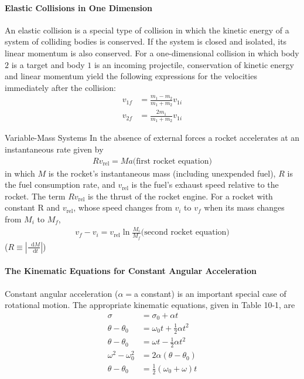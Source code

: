 \documentclass{article}
\newcommand*\diff{\mathop{}\!\mathrm{d}}
\numberwithin{equation}{subsection} %
\theoremstyle{definition}
\begin{document}
\paragraph{Elastic Collisions in One Dimension} An elastic collision
is a special type of collision in which the kinetic energy of a system
of colliding bodies is conserved. If the system is closed and
isolated, its linear momentum is also conserved. For a one-dimensional
collision in which body $2$ is a target and body $1$ is an incoming
projectile, conservation of kinetic energy and linear momentum yield
the following expressions for the velocities immediately after the
collision:
\begin{align}
    v_{1f} &= \frac{m_1-m_2}{m_1+m_2} v_{1i} \\
    v_{2f} &= \frac{2m_1}{m_1+m_2} v_{1i}
\end{align}

Variable-Mass Systems In the absence of external forces a rocket
accelerates at an instantaneous rate given by
\begin{align}
    R v_{\text{rel}} = Ma \text{(first rocket equation)}
\end{align}
in which $M$ is the rocket’s instantaneous mass (including
unexpended fuel), $R$ is the fuel consumption rate, and $v_{\text{rel}}$ is the fuel’s
exhaust speed relative to the rocket. The term $R v_{\text{rel}}$ is the thrust of
the rocket engine. For a rocket with constant R and $v_{\text{rel}}$, whose speed
changes from $v_i$ to $v_f$ when its mass changes from $M_i$ to $M_f$,
\begin{align}
    v_f - v_i = v_{\text{rel}} \ln\frac{M_i}{M_f} \text{(second rocket
    equation)}
\end{align}
($R\equiv |\frac{\diff M}{\diff t}|$)

\paragraph{The Kinematic Equations for Constant Angular Acceleration}
Constant angular acceleration ($\alpha =$a constant) is an important
special case of rotational motion. The appropriate kinematic
equations, given in Table 10-1, are
\begin{align}
    \sigma &= \sigma_0 + \alpha t \\
    \theta - \theta_0 &= \omega_0 t + \frac{1}{2} \alpha t^2 \\
    \theta - \theta_0 &= \omega t - \frac{1}{2} \alpha t^2 \\
    \omega^2 - \omega_0^2 &= 2\alpha (\theta - \theta_0) \\
    \theta - \theta_0 &= \frac{1}{2}(\omega_0 + \omega) t
\end{align}
\end{document}
